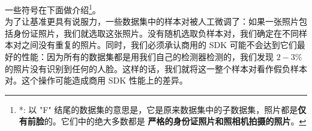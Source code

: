 \documentclass[a4paper, 11pt, UTF8]{ctexart}%
\begin{document}
一些符号在下面做介绍\footnote{*: 以 "F" 结尾的数据集的意思是，它是原来数据集中的子数据集，照片都是\textbf{仅有前脸}的。它们中的绝大多数都是 \textbf{严格的身份证照片和照相机拍摄的照片}。 %
}。 \\
为了让基准更具有说服力，一些数据集中的样本对被人工微调了：如果一张照片包括身份证照片，我们就选取这张照片。没有随机选取负样本对，我们确定在不同样本对之间没有重复的照片。同时，我们必须承认商用的 SDK 可能不会达到它们最好的性能：因为所有的数据集都是用我们自己的检测器检测的，我们发现 $2-3\%$的照片没有识别到任何的人脸。这样的话，我们就将这一整个样本对看作假负样本对。这个操作可能造成商用 SDK 性能上的差异。
\end{document}
